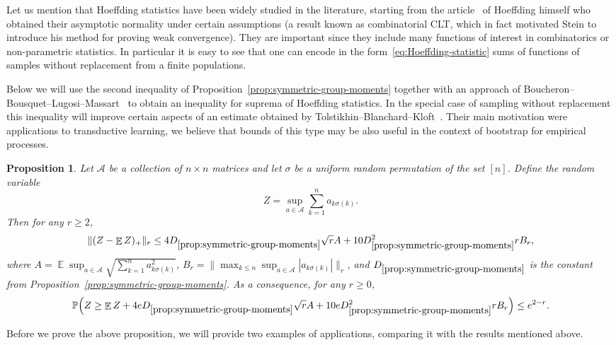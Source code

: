 \documentclass[a4paper]{amsart}
\newtheorem{proposition}[theorem]{Proposition} %
\theoremstyle{definition}
\theoremstyle{remark}
\numberwithin{equation}{section}
\newcommand*{\ds}{D_{\ref{prop:symmetric-group-moments}}}
\DeclareMathOperator{\EE}{\mathbb{E}} %
\newcommand*{\PP}{\mathbb{P}} %
\begin{document}
Let us mention that Hoeffding statistics have been widely studied in the literature, starting from the article~\cite{MR44058} of Hoeffding himself who obtained their asymptotic normality under certain assumptions (a result known as combinatorial CLT, which in fact motivated Stein to introduce his method for proving weak convergence). They are important since they include many functions of interest in combinatorics or non-parametric statistics. In particular it is easy to see that one can encode in the form~\eqref{eq:Hoeffding-statistic} sums of functions of samples without replacement from a finite populations.

Below we will use the second inequality of Proposition~\ref{prop:symmetric-group-moments} together with an approach of Boucheron--Bousquet--Lugosi--Massart~\cite{MR2123200} to obtain an inequality for suprema of Hoeffding statistics. In the special case of sampling without replacement this inequality will improve certain aspects of an estimate obtained by Tolstikhin--Blanchard--Kloft~\cite{MR3480745}. Their main motivation were applications to transductive learning, we believe that bounds of this type may be also useful in the context of bootstrap for empirical processes.

\begin{proposition}
\label{prop:Hoeffding}
Let $\mathcal{A}$ be a collection of $n\times n$ matrices and let $\sigma$ be a uniform random permutation of the set $[n]$. Define the random variable
\begin{displaymath}
  Z = \sup_{a \in \mathcal{A}} \sum_{k=1}^n a_{k\sigma(k)}.
\end{displaymath}
Then for any $r\ge 2$,
\begin{equation}\label{eq:Hoeffding-prop-1}
\|(Z - \EE Z)_+\|_r \le 4\ds\sqrt{r}A + 10\ds ^2rB_r,
\end{equation}
where $A = \EE\sup_{a \in \mathcal{A}}\sqrt{\sum_{k=1}^n a_{k\sigma(k)}^2}$, $B_r = \big\|\max_{k\le n}\sup_{a\in\mathcal{A}}|a_{k\sigma(k)}|\big\|_r$, and $\ds$ is the constant from Proposition~\ref{prop:symmetric-group-moments}.
As a consequence, for any $r \ge 0$,
\begin{equation}\label{eq:Hoeffding-prop-2}
  \PP\Big(Z \ge \EE Z + 4e\ds\sqrt{r}A + 10e\ds ^2rB_r\Big) \le e^{2-r}.
\end{equation}
\end{proposition}


Before we prove the above proposition, we will provide two examples of applications, comparing it with the results mentioned above.
\end{document}
